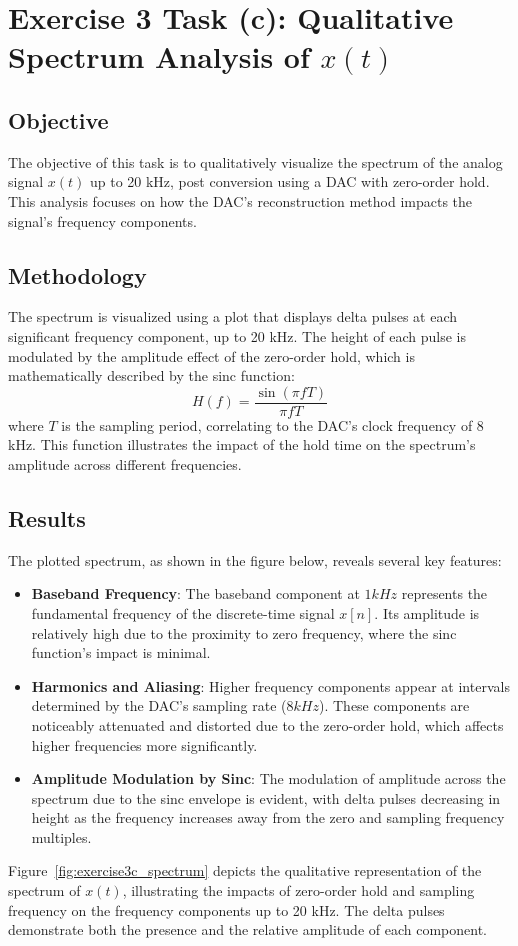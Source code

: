\item[(c)]
\section*{Exercise 3 Task (c): Qualitative Spectrum Analysis of \(x(t)\)}

\subsection*{Objective}
The objective of this task is to qualitatively visualize the spectrum of the analog signal \(x(t)\) up to 20 kHz, post conversion using a DAC with zero-order hold. This analysis focuses on how the DAC's reconstruction method impacts the signal's frequency components.

\subsection*{Methodology}
The spectrum is visualized using a plot that displays delta pulses at each significant frequency component, up to 20 kHz. The height of each pulse is modulated by the amplitude effect of the zero-order hold, which is mathematically described by the sinc function:
\[
H(f) = \frac{\sin(\pi f T)}{\pi f T}
\]
where \(T\) is the sampling period, correlating to the DAC's clock frequency of 8 kHz. This function illustrates the impact of the hold time on the spectrum's amplitude across different frequencies.

\subsection*{Results}
The plotted spectrum, as shown in the figure below, reveals several key features:
\begin{itemize}
    \item \textbf{Baseband Frequency}: The baseband component at \(1 kHz\) represents the fundamental frequency of the discrete-time signal \(x[n]\).
    Its amplitude is relatively high due to the proximity to zero frequency, where the sinc function's impact is minimal.
    \item \textbf{Harmonics and Aliasing}: Higher frequency components appear at intervals determined by the DAC's sampling rate (\(8 kHz\)). These components are noticeably attenuated and distorted due to the zero-order hold, which affects higher frequencies more significantly.
    \item \textbf{Amplitude Modulation by Sinc}: The modulation of amplitude across the spectrum due to the sinc envelope is evident, with delta pulses decreasing in height as the frequency increases away from the zero and sampling frequency multiples.
\end{itemize}
Figure~\ref{fig:exercise3c_spectrum} depicts the qualitative representation of the spectrum of \(x(t)\),
illustrating the impacts of zero-order hold and sampling frequency on the frequency components up to 20 kHz.
The delta pulses demonstrate both the presence and the relative amplitude of each component.

